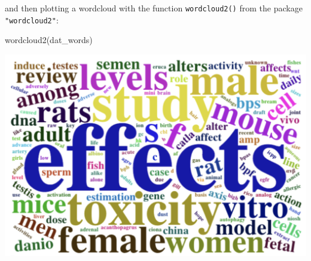 \documentclass[
]{book}
\newenvironment{Shaded}{\begin{snugshade}}{\end{snugshade}}
\newcommand{\FunctionTok}[1]{\textcolor[rgb]{0.00,0.00,0.00}{#1}}
\newcommand{\NormalTok}[1]{#1}
\begin{document}
and then plotting a wordcloud with the function \texttt{wordcloud2()} from the package
\texttt{"wordcloud2"}:

\begin{Shaded}
\begin{Highlighting}[]
\FunctionTok{wordcloud2}\NormalTok{(dat\_words)}
\end{Highlighting}
\end{Shaded}

\begin{center}\includegraphics[width=0.7\linewidth]{images/api/wordcloud_img} \end{center}

  
\end{document}
